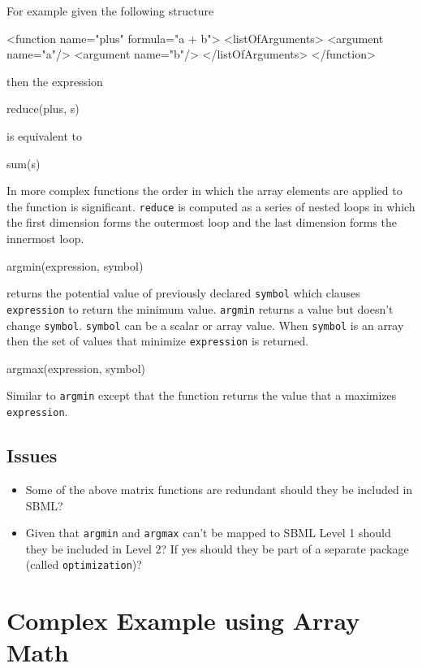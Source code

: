 \documentclass{cekarticle}
\begin{document}
For example given the following structure
\begin{example}
<function name="plus" formula="a + b">
    <listOfArguments>
        <argument name="a"/>
        <argument name="b"/>
    </listOfArguments>
</function>
\end{example}
then the expression
\begin{example}
reduce(plus, s)
\end{example}
is equivalent to
\begin{example}
sum(s)
\end{example}

In more complex functions the order in which the array elements
are applied to the function is significant.  \texttt{reduce} is
computed as a series of nested loops in which the first dimension
forms the outermost loop and the last dimension forms the
innermost loop.

\begin{example}
argmin(expression, symbol)
\end{example}

returns the potential value of previously declared
\texttt{symbol} which clauses \texttt{expression} to return the
minimum value. \texttt{argmin} returns a value but doesn't change
\texttt{symbol}.  \texttt{symbol} can be a scalar or array value.
When \texttt{symbol} is an array then the set of values that
minimize \texttt{expression} is returned.

\begin{example}
argmax(expression, symbol)
\end{example}

Similar to \texttt{argmin} except that the function returns the
value that a maximizes \texttt{expression}.

\subsection{Issues}
\begin{itemize}
\item Some of the above matrix functions are redundant should they be included in SBML?
\item Given that \texttt{argmin} and \texttt{argmax} can't be mapped to SBML Level 1
should they be included in Level 2?  If yes should they be part
of a separate package (called \texttt{optimization})?
\end{itemize}

\section{Complex Example using Array Math}
\end{document}
